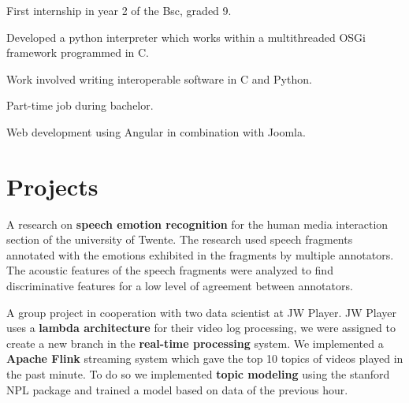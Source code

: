 \documentclass[a4paper]{deedy-resume} %
\begin{document}
\begin{minipage}[t]{0.62\textwidth}
\begin{tightitemize}
\item First internship in year 2 of the Bsc, graded 9.
\item Developed a python interpreter which works within a multithreaded OSGi framework programmed in C.
\item Work involved writing interoperable software in C and Python.
\end{tightitemize}

\sectionspace %



\begin{tightitemize}
\item Part-time job during bachelor.
\item Web development using Angular in combination with Joomla.
\end{tightitemize}

\sectionspace %



\section{Projects}

A research on \textbf{speech emotion recognition} for the human media interaction section of the university of Twente. The research used speech fragments annotated with the emotions exhibited in the fragments by multiple annotators. The acoustic features of the speech fragments were analyzed to find discriminative features for a low level of agreement between annotators.

\sectionspace

A group project in cooperation with two data scientist at JW Player. JW Player uses a \textbf{lambda architecture} for their video log processing, we were assigned to create a new branch in the \textbf{real-time processing} system. We implemented a \textbf{Apache Flink} streaming system which gave the top 10 topics of videos played in the past minute. To do so we implemented \textbf{topic modeling} using the stanford NPL package and trained a model based on data of the previous hour.


\end{minipage}
\end{document}
